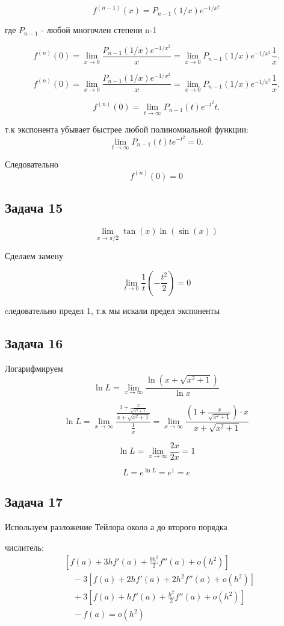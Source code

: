 \documentclass[a4paper,12pt]{article}
\begin{document}
\[
f^{(n-1)}(x) = P_{n-1}(1/x) e^{-1/x^2}
\]

где $P_{n-1}$ - любой многочлен степени n-1

\[
    f^{(n)}(0) = \lim_{x \to 0}\frac{P_{n-1}(1/x)e^{-1/x^2}}{x} = \lim_{x \to 0}P_{n-1}(1/x)e^{-1/x^2}\frac{1}{x}.
\]

\[
    f^{(n)}(0) = \lim_{x \to 0}\frac{P_{n-1}(1/x)e^{-1/x^2}}{x} = \lim_{x \to 0}P_{n-1}(1/x)e^{-1/x^2}\frac{1}{x}.
\]

\[
    f^{(n)}(0) = \lim_{t \to \infty} P_{n-1}(t) e^{-t^2} t.
\]

т.к экспонента убывает быстрее любой полиномиальной функции:
\[
    \lim_{t \to \infty} P_{n-1}(t)t e^{-t^2} = 0.
\]

Следовательно 
\[
    f^{(n)}(0) = 0
\]

\subsection{Задача 15}

\[
\lim_{x \to \pi/2} \tan(x)\ln(\sin(x))
\]

Сделаем замену

\[
\lim_{t \to 0} \frac{1}{t}(-\frac{t^2}{2}) = 0
\]

cледовательно предел 1, т.к мы искали предел экспоненты

\subsection{Задача 16}
Логарифмируем
\[
    \ln L = \lim_{x \to \infty} \frac{\ln\left( x + \sqrt{x^2 + 1} \right)}{\ln x}
\]

\[
    \ln L = \lim_{x \to \infty} \frac{\frac{1 + \frac{x}{\sqrt{x^2 + 1}}}{x + \sqrt{x^2 + 1}}}{\frac{1}{x}} = \lim_{x \to \infty} \frac{\left(1 + \frac{x}{\sqrt{x^2 + 1}}\right) \cdot x}{x + \sqrt{x^2 + 1}}
\]

\[
    \ln L = \lim_{x \to \infty} \frac{2x}{2x} = 1
\]

\[
    L = e^{\ln L} = e^1 = e
\]

\subsection{Задача 17}
Используем разложение Тейлора около а до второго порядка

числитель:
\begin{align*}
    &\left[ f(a) + 3h f'(a) + \frac{9h^2}{2} f''(a) + o(h^2) \right] \\
    &\quad - 3\left[ f(a) + 2h f'(a) + 2h^2 f''(a) + o(h^2) \right] \\
    &\quad + 3\left[ f(a) + h f'(a) + \frac{h^2}{2} f''(a) + o(h^2) \right] \\
    &\quad - f(a) = o(h^2)
\end{align*}
\end{document}
